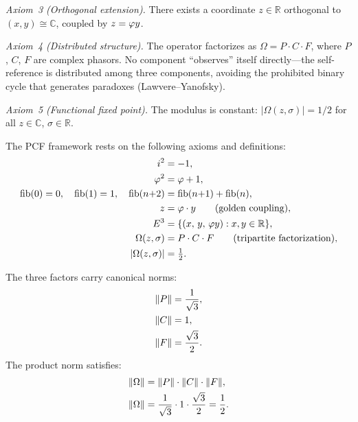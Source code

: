 \emph{Axiom~3 (Orthogonal extension).}  There exists a coordinate
$z\in\mathbb{R}$ orthogonal to $(x,y)\cong\mathbb{C}$, coupled by
$z=\varphi y$.

\emph{Axiom~4 (Distributed structure).}  The operator factorizes as
$\Omega = P\cdot C\cdot F$, where $P$, $C$, $F$ are complex phasors.
No component ``observes'' itself directly---the self-reference is distributed
among three components, avoiding the prohibited binary cycle that generates
paradoxes (Lawvere--Yanofsky).

\emph{Axiom~5 (Functional fixed point).}  The modulus is constant:
$|\Omega(z,\sigma)|=1/2$ for all $z\in\mathbb{C}$, $\sigma\in\mathbb{R}$.

\begin{Definition}\label{def:axioms}
The PCF framework rests on the following axioms and definitions:
\begin{align}
  i^2 &= -1,
    \label{eq:i-sq}  \\
  \varphi^2 &= \varphi + 1,
    \label{eq:phi-sq}  \\
  \mathrm{fib}(0) = 0,\quad
  \mathrm{fib}(1) = 1,\quad
  \mathrm{fib}(n{+}2) &= \mathrm{fib}(n{+}1) + \mathrm{fib}(n),
    \label{eq:fib}  \\
  z &= \varphi \cdot y \qquad\text{(golden coupling)},
    \label{eq:golden-coupling}  \\
  E^3 &= \{(x,\, y,\, \varphi y) : x,y\in\mathbb{R}\},
    \label{eq:E3}  \\
  \Omega(z,\sigma) &= P \cdot C \cdot F
    \qquad\text{(tripartite factorization)},
    \label{eq:Omega-PCF}  \\
  |\Omega(z,\sigma)| &= \tfrac{1}{2}.
    \label{eq:modulus-Omega}
\end{align}
\end{Definition}

\begin{Definition}\label{def:component-norms}
The three factors carry canonical norms:
\begin{align}
  \|P\| &= \frac{1}{\sqrt{3}},
    \label{eq:norm-P}  \\
  \|C\| &= 1,
    \label{eq:norm-C}  \\
  \|F\| &= \frac{\sqrt{3}}{2}.
    \label{eq:norm-F}
\end{align}
The product norm satisfies:
\begin{align}
  \|\Omega\| &= \|P\|\cdot\|C\|\cdot\|F\|,
    \label{eq:norm-Omega-product}  \\
  \|\Omega\| &= \frac{1}{\sqrt{3}} \cdot 1 \cdot \frac{\sqrt{3}}{2}
    = \frac{1}{2}.
    \label{eq:norm-Omega-half}
\end{align}
\end{Definition}

